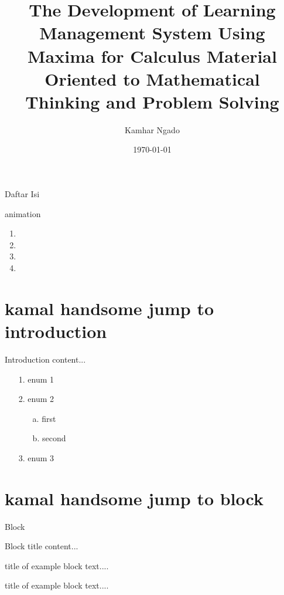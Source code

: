 \documentclass[compress,red]{beamer}
\title[LMS U Maxima 4 Calculus]{The Development of Learning Management System Using Maxima for Calculus Material Oriented to Mathematical Thinking and Problem Solving}
\author[uny.ac.id]{Kamhar Ngado}
\institute[\tiny{Yogyakarta State University}]{Yogyakarta State University}
\date {\today}
\begin{document}
	
	\begin{frame}[t]
		\titlepage
	\end{frame}
	

	\begin{frame}[t] {Daftar Isi}
	\tableofcontents 
	\end{frame}

	\begin{frame}{animation}
		\begin{enumerate}
		\item {}			
		\item {}
		\item {}			
		\item {}
	\end{enumerate}
	\end{frame}


	\section{kamal handsome jump to introduction}%
	\begin{frame}[t] {Introduction}
	content...
		\begin{enumerate}[1] %
			\item [1.] enum 1
			\item [2.] enum 2
			
			\begin{itemize}
				\item [a.] first
				\item [b.] second
			\end{itemize}
			\item [3.] enum 3
		\end{enumerate}
	\end{frame}

	\section{kamal handsome jump to block}%
	\begin{frame}[t] {Block} %
		\begin{block}{Block title}
			content...
		\end{block}
		\vfill %
		\begin{exampleblock} {title of example block}
			text....
		\end{exampleblock}
		\vfill
		\begin{exampleblock} {title of example block}
		text....
		\end{exampleblock}
	\end{frame}
\end{document}
